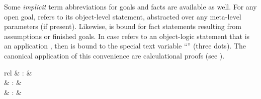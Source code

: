 \begin{isabellebody}
\begin{isamarkuptext}
  Some \emph{implicit} term abbreviations
  for goals and facts are available as well.  For any open goal,
  \hyperlink{variable.thesis}{\mbox{}} refers to its object-level statement,
  abstracted over any meta-level parameters (if present).  Likewise,
  \hyperlink{variable.this}{\mbox{}} is bound for fact statements resulting from
  assumptions or finished goals.  In case \hyperlink{variable.this}{\mbox{}} refers to
  an object-logic statement that is an application , then
   is bound to the special text variable ``\hyperlink{variable.dots}{\mbox{}}''
  (three dots).  The canonical application of this convenience are
  calculational proofs (see ).%
\end{isamarkuptext}%
\isamarkuptrue%
%
\isamarkuptrue%
%
\begin{isamarkuptext}%
\begin{matharray}{rcl}
    \hypertarget{command.note}{\hyperlink{command.note}{\mbox{}}} & : &  \\
    \hypertarget{command.then}{\hyperlink{command.then}{\mbox{}}} & : &  \\
    \hypertarget{command.from}{\hyperlink{command.from}{\mbox{}}} & : &  \\

\end{matharray}
\end{isamarkuptext}
\end{isabellebody}
